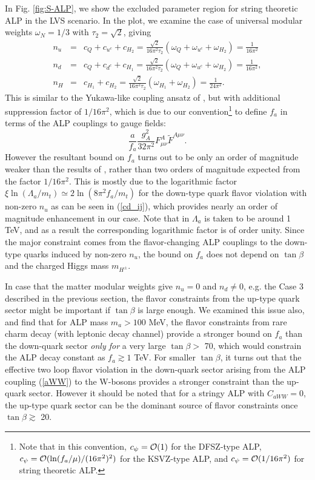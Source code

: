\documentclass[preprint,prd,aps,tighten,nofootinbib,amssymb]{revtex4}
\newcommand{\bea}{\begin{eqnarray}}
\newcommand{\eea}{\end{eqnarray}}
\def\vpq{f_{a}}
\begin{document}
In Fig. \ref{fig:S-ALP}, we show the excluded parameter region for string theoretic ALP in the LVS scenario.
In the plot, we examine the case of  universal modular weights $\omega_N=1/3$ with $\tau_2 = \sqrt{2}$,
giving
\bea
n_u&=&c_Q+c_{u^c}+c_{H_2}=\frac{\sqrt{2}}{16\pi^2 \tau_2} \left(\omega_{Q}+\omega_{u^c}+\omega_{H_2} \right)=\frac{1}{16\pi^2}\nonumber \\
n_d &=&c_Q+c_{d^c}+c_{H_1}=\frac{\sqrt{2}}{16\pi^2 \tau_2} \left(\omega_{Q}+\omega_{u^c}+\omega_{H_2} \right)=\frac{1}{16\pi^2},\nonumber \\
n_H &=&c_{H_1}+c_{H_2}=\frac{\sqrt{2}}{16\pi^2 \tau_2} \left(\omega_{H_1}+\omega_{H_2} \right)=\frac{1}{24\pi^2}.\nonumber \eea
This is similar to the Yukawa-like coupling ansatz of \cite{Batell:2009jf, Dolan:2014ska}, but with additional suppression factor of $1/16\pi^2$, which is due to our convention\footnote{Note that in this convention, $c_\psi = {\cal O}(1)$ for the DFSZ-type ALP, $c_\psi = {\cal O}(\ln(f_a/\mu)/(16\pi^2)^2)$ for the KSVZ-type ALP, and $c_\psi={\cal O}(1/16\pi^2)$ for string theoretic ALP.}  to define $f_a$ in terms of the ALP couplings to gauge fields:
$$
 \frac{a}{f_a}\frac{g_A^2}{32\pi^2}F^A_{\mu\nu}\tilde F^{A\mu\nu}.
$$ However the resultant bound on $\vpq$ turns out to be only an order of magnitude weaker than the results of \cite{Batell:2009jf, Dolan:2014ska}, rather than  two orders of magnitude expected from the factor $1/16\pi^2$.
This is mostly due to the logarithmic 
factor $\xi\ln(\Lambda_a/m_t)\simeq 2\ln(8\pi^2 f_a/m_t)$ for the down-type quark flavor violation with non-zero $n_u$ as can be seen in (\ref{cd_ij}), which provides nearly an order of magnitude enhancement in our case. Note that in \cite{Batell:2009jf, Dolan:2014ska} $\Lambda_a$ is taken to be around 1 TeV, and as a result the corresponding logarithmic factor is of order unity. 
Since the major constraint  comes from the flavor-changing ALP couplings to the down-type quarks induced by  non-zero $n_u$, the bound on $\vpq$ does not depend on $\tan \beta$ and the charged Higgs mass $m_{H^\pm}$. 

In case that the matter modular weights give $n_u =0$ and $n_d\neq 0$, e.g. the Case 3 described in the previous section, the flavor constraints from the up-type quark sector might be important  if  $\tan \beta$ is large enough.
We examined this issue also, and find that for ALP mass $m_a> 100$ MeV,  the  flavor constraints from rare charm decay (with leptonic decay channel)  provide a stronger bound on $f_a$   than the down-quark sector  {\it only for} a very large  $\tan \beta >$ 70, which would constrain the ALP decay constant as $\vpq \gtrsim 1$ TeV. For smaller  $\tan \beta$, it turns out that the effective two loop flavor violation in the down-quark sector \cite{Izaguirre:2016dfi} arising from the ALP coupling (\ref{aWW}) to the W-bosons provides a stronger constraint than the up-quark sector.
However it should be noted that
 for a stringy ALP with $C_{aWW}=0$,
the up-type quark sector can be the dominant source of flavor constraints once 
$\tan \beta \gtrsim $ 20. 
\end{document}
